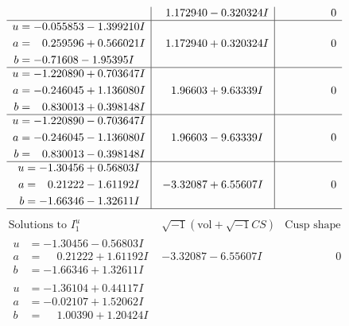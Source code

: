\documentclass[1p]{elsarticle_modified}
\theoremstyle{definition}
\newcommand{\I}{\sqrt{-1}}
\begin{document}
$$\begin{array}{c|c|c}
 & \phantom{-}1.172940 - 0.320324 I & \phantom{-0.000000 } 0 \\ \hline\begin{aligned}
u &= -0.055853 - 1.399210 I \\
a &= \phantom{-}0.259596 + 0.566021 I \\
b &= -0.71608 - 1.95395 I\end{aligned}
 & \phantom{-}1.172940 + 0.320324 I & \phantom{-0.000000 } 0 \\ \hline\begin{aligned}
u &= -1.220890 + 0.703647 I \\
a &= -0.246045 + 1.136080 I \\
b &= \phantom{-}0.830013 + 0.398148 I\end{aligned}
 & \phantom{-}1.96603 + 9.63339 I & \phantom{-0.000000 } 0 \\ \hline\begin{aligned}
u &= -1.220890 - 0.703647 I \\
a &= -0.246045 - 1.136080 I \\
b &= \phantom{-}0.830013 - 0.398148 I\end{aligned}
 & \phantom{-}1.96603 - 9.63339 I & \phantom{-0.000000 } 0 \\ \hline\begin{aligned}
u &= -1.30456 + 0.56803 I \\
a &= \phantom{-}0.21222 - 1.61192 I \\
b &= -1.66346 - 1.32611 I\end{aligned}
 & -3.32087 + 6.55607 I & \phantom{-0.000000 } 0\\
 \hline 
 \end{array}$$\newpage$$\begin{array}{c|c|c}  
\text{Solutions to }I^u_{1}& \I (\text{vol} + \sqrt{-1}CS) & \text{Cusp shape}\\
 \hline 
\begin{aligned}
u &= -1.30456 - 0.56803 I \\
a &= \phantom{-}0.21222 + 1.61192 I \\
b &= -1.66346 + 1.32611 I\end{aligned}
 & -3.32087 - 6.55607 I & \phantom{-0.000000 } 0 \\ \hline\begin{aligned}
u &= -1.36104 + 0.44117 I \\
a &= -0.02107 + 1.52062 I \\
b &= \phantom{-}1.00390 + 1.20424 I\end{aligned}

\end{array}$$
\end{document}
